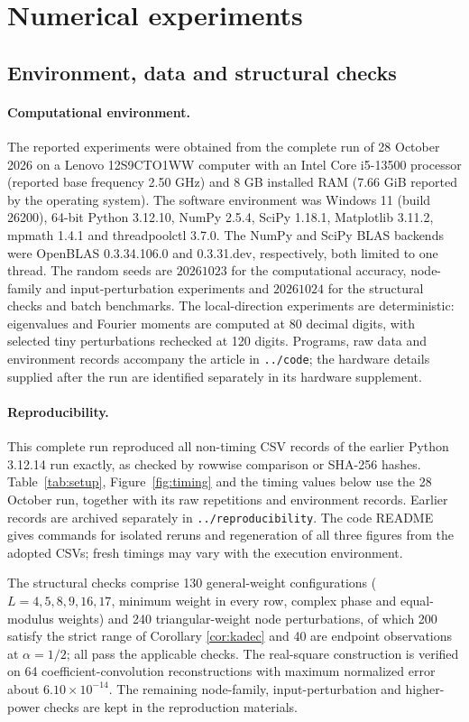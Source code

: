 \documentclass[10pt,twoside,final]{siamart1116}
\numberwithin{equation}{section}
\numberwithin{theorem}{section}
\begin{document}
\section{Numerical experiments}\label{sec:experiments}

\subsection{Environment, data and structural checks}

\paragraph{Computational environment.}
The reported experiments were obtained from the complete run of 28 October 2026
on a Lenovo 12S9CTO1WW computer with an Intel Core i5-13500 processor
(reported base frequency 2.50 GHz) and 8 GB installed RAM
(7.66 GiB reported by the operating system). The software environment was
Windows 11 (build 26200), 64-bit Python 3.12.10, NumPy 2.5.4,
SciPy 1.18.1, Matplotlib 3.11.2, mpmath 1.4.1 and threadpoolctl 3.7.0.
The NumPy and SciPy BLAS backends were OpenBLAS 0.3.34.106.0 and
0.3.31.dev, respectively, both limited to one thread.
The random seeds are $20261023$ for the computational accuracy, node-family
and input-perturbation experiments and $20261024$ for the structural checks
and batch benchmarks. The local-direction experiments are deterministic:
eigenvalues and Fourier moments are computed at 80 decimal digits, with
selected tiny perturbations rechecked at 120 digits.
Programs, raw data and environment records accompany the article in
\texttt{../code}; the hardware details supplied after the run are identified
separately in its hardware supplement.

\paragraph{Reproducibility.}
This complete run reproduced all non-timing CSV records of the earlier
Python 3.12.14 run exactly, as checked by rowwise comparison or SHA-256 hashes.
Table~\ref{tab:setup}, Figure~\ref{fig:timing} and the timing values below
use the 28 October run, together with its raw repetitions and environment
records. Earlier records are archived separately in \texttt{../reproducibility}.
The code README gives commands for isolated reruns and regeneration of all
three figures from the adopted CSVs; fresh timings may vary with the execution
environment.

The structural checks comprise 130 general-weight configurations ($L=4,5,8,9,16,17$,
minimum weight in every row, complex phase and equal-modulus weights) and 240
triangular-weight node perturbations, of which 200 satisfy the strict range of Corollary
\ref{cor:kadec} and 40 are endpoint observations at $\alpha=1/2$; all pass the
applicable checks. The real-square construction is verified on 64 coefficient-convolution
reconstructions with maximum normalized error about $6.10\times10^{-14}$. The remaining
node-family, input-perturbation and higher-power checks are kept in the reproduction
materials.
\end{document}
